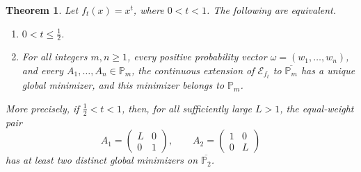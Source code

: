 \documentclass[11pt]{amsart}
\newtheorem{theorem}{Theorem}[section]
\theoremstyle{definition}
\theoremstyle{remark}
\begin{document}
 \begin{theorem}
		\label{thm:power-barycenter-phase-transition}
		Let $f_t(x)=x^t$, where $0<t<1$.  The following are equivalent.
		\begin{enumerate}
			\item[\rm(i)] $0<t\le\frac12$.
			
			\item[\rm(ii)] For all integers $m,n\ge1$, every positive probability
			vector $\omega=(w_1,\ldots,w_n)$, and every
			$A_1,\ldots,A_n\in\mathbb P_m$, the continuous extension of
			$\mathcal E_{f_t}$ to $\overline{\mathbb P_m}$ has a unique global
			minimizer, and this minimizer belongs to $\mathbb P_m$.
		\end{enumerate}
		More precisely, if $\frac12<t<1$, then, for all sufficiently large
		$L>1$, the equal-weight pair
		\[
		A_1=\begin{pmatrix}L&0\\0&1\end{pmatrix},
		\qquad
		A_2=\begin{pmatrix}1&0\\0&L\end{pmatrix}
		\]
		has at least two distinct global minimizers on
		$\overline{\mathbb P_2}$.
	\end{theorem}
	
\end{document}
